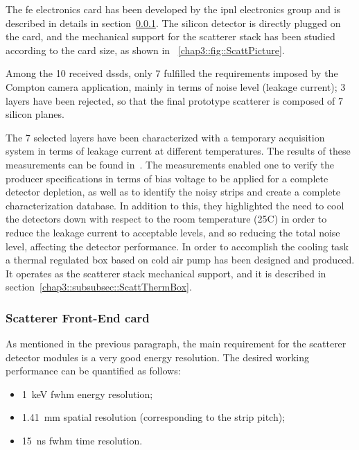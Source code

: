The \gls{fe} electronics card has been developed by the \gls{ipnl} electronics group and is described in details in section~\ref{chap3::subsubsec::ScattFEcard}. The silicon detector is directly plugged on the card, and the mechanical support for the scatterer stack has been studied according to the card size, as shown in \figurename~\ref{chap3::fig::ScattPicture}.
   
Among the 10 received \glspl{dssd}, only 7 fulfilled the requirements imposed by the Compton camera application, mainly in terms of noise level (leakage current); 3 layers have been rejected, so that the final prototype scatterer is composed of 7 silicon planes.

The 7 selected layers have been characterized with a temporary acquisition system in terms of leakage current at different temperatures. The results of these measurements can be found in~\cite{Ley2015}. The measurements enabled one to verify the producer specifications in terms of bias voltage to be applied for a complete detector depletion, as well as to identify the noisy strips and create a complete characterization database. In addition to this, they highlighted the need to cool the detectors down with respect to the room temperature (25\textdegree{}C) in order to reduce the leakage current to acceptable levels, and so reducing the total noise level, affecting the detector performance. In order to accomplish the cooling task a thermal regulated box based on cold air pump has been designed and produced. It operates as the scatterer stack mechanical support, and it is described in section~\ref{chap3::subsubsec::ScattThermBox}.
      
 

\subsubsection{Scatterer Front-End card}\label{chap3::subsubsec::ScattFEcard}
As mentioned in the previous paragraph, the main requirement for the scatterer detector modules is a very good energy resolution. The desired working performance can be quantified as follows:
\begin{itemize}
\item 1~keV \gls{fwhm} energy resolution;
\item 1.41~mm spatial resolution (corresponding to the strip pitch);
\item 15~ns \gls{fwhm} time resolution.
\end{itemize} 

